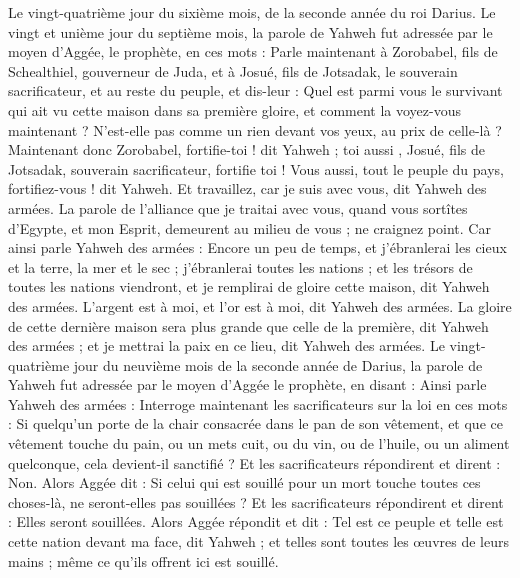 \begin{multicols}{2}
Le vingt-quatrième jour du sixième mois, de la seconde année du roi Darius.
\VerseOne{}Le vingt et unième jour du septième mois, la parole de Yahweh fut adressée par le moyen d'Aggée, le prophète, en ces mots :
Parle maintenant à Zorobabel, fils de Schealthiel, gouverneur de Juda, et à Josué, fils de Jotsadak, le souverain sacrificateur, et au reste du peuple, et dis-leur :
Quel est parmi vous le survivant qui ait vu cette maison dans sa première gloire, et comment la voyez-vous maintenant ? N'est-elle pas comme un rien devant vos yeux, au prix de celle-là ?
Maintenant donc Zorobabel, fortifie-toi ! dit Yahweh ;  toi aussi , Josué, fils de Jotsadak, souverain sacrificateur, fortifie toi ! Vous aussi, tout le peuple du pays, fortifiez-vous ! dit Yahweh. Et travaillez, car je suis avec vous, dit Yahweh des armées.
La parole de l'alliance que je traitai avec vous, quand vous sortîtes d'Egypte, et mon Esprit, demeurent au milieu de vous ; ne craignez point.
Car ainsi parle Yahweh des armées : Encore un peu de temps, et j'ébranlerai les cieux et la terre, la mer et le sec ;
j'ébranlerai toutes les nations ; et les trésors de toutes les nations viendront, et je remplirai de gloire cette maison, dit Yahweh des armées.
L'argent est à moi, et l'or est à moi, dit Yahweh des armées.
La gloire de cette dernière maison sera plus grande que celle de la première, dit Yahweh des armées ; et je mettrai la paix en ce lieu, dit Yahweh des armées.
Le vingt-quatrième jour du neuvième mois de la seconde année de Darius, la parole de Yahweh fut adressée par le moyen d'Aggée le prophète, en disant :
Ainsi parle Yahweh des armées : Interroge maintenant les sacrificateurs sur la loi en ces mots :
Si quelqu'un porte de la chair consacrée dans le pan de son vêtement, et que ce vêtement touche du pain, ou un mets cuit, ou du vin, ou de l'huile, ou un aliment quelconque, cela devient-il sanctifié ? Et les sacrificateurs répondirent et dirent : Non.
Alors Aggée dit : Si celui qui est souillé pour un mort touche toutes ces choses-là, ne seront-elles pas souillées ? Et les sacrificateurs répondirent et dirent : Elles seront souillées.
Alors Aggée répondit et dit : Tel est ce peuple et telle est cette nation devant ma face, dit Yahweh ; et telles sont toutes les œuvres de leurs mains ; même ce qu'ils offrent ici est souillé.

\end{multicols}
